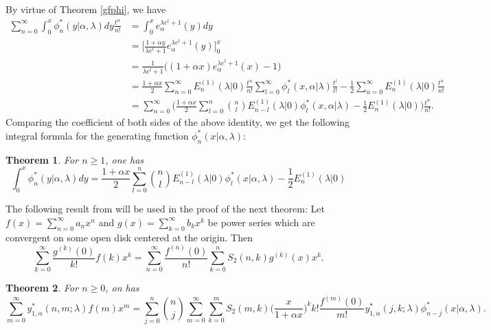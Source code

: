 \documentclass{amsart}
\newtheorem{theorem}{Theorem}[section]
\numberwithin{equation}{section}
\theoremstyle{definition}
\theoremstyle{remark}
\begin{document}
By virtue of Theorem \ref{gfphi}, we have 
\begin{align}
    \sum_{n=0}^{\infty}\int_{0}^{x}\phi^{*}_{n}(y|\alpha,\lambda)dy\frac{t^n}{n!}&=\int_{0}^{x}e_{\alpha}^{\lambda e^{t}+1}(y)dy\\
    &=\Bigg[\frac{1+\alpha y}{\lambda e^t+1}e_{\alpha}^{\lambda e^t+1}(y)\Bigg]_{0}^{x}\\
    &=\frac{1}{\lambda e^t+1}\Big((1+\alpha x)e_{\alpha}^{\lambda e^t+1}(x)-1\Big)\label{integeq2}\\
    &=\frac{1+\alpha x}{2}\sum_{n=0}^{\infty}E_{n}^{(1)}(\lambda|0)\frac{t^n}{n!}\sum_{l=0}^{\infty}\phi^{*}_{l}(x,\alpha|\lambda)\frac{t^l}{l!}-\frac{1}{2}\sum_{n=0}^{\infty}E_{n}^{(1)}(\lambda|0)\frac{t^n}{n!}\\
    &=\sum_{n=0}^{\infty}\bigg(\frac{1+\alpha x}{2}\sum_{l=0}^{n}\binom{n}{l}E_{n-l}^{(1)}(\lambda|0)\phi^{*}_{l}(x,\alpha|\lambda)-\frac{1}{2}E_{n}^{(1)}(\lambda|0)\bigg)\frac{t^n}{n!}.
\end{align}
Comparing the coefficient of both sides of the above identity, we get the following integral formula for the generating function $\phi^{*}_{n}(x|\alpha,\lambda)$:
\begin{theorem}\label{integphi}
For $n\geq 1$, one has
\begin{equation}
    \int_{0}^{x}\phi^{*}_{n}(y|\alpha,\lambda)dy=\frac{1+\alpha x}{2}\sum_{l=0}^{n}\binom{n}{l}E_{n-l}^{(1)}(\lambda|0)\phi^{*}_{l}(x|\alpha,\lambda)-\frac{1}{2}E_{n}^{(1)}(\lambda|0)
\end{equation}
\end{theorem}
The following result from \cite{KNB2005, TKDSK2022} will be used in the proof of the next theorem: Let $f(x)=\sum_{n=0}^{\infty}a_nx^n$ and $g(x)=\sum_{k=0}^{\infty}b_kx^k$ be power series which are convergent on some open disk centered at the origin. Then 
\begin{equation}\label{Formpowerseries}
    \sum_{k=0}^{\infty}\frac{g^{(k)}(0)}{k!}f(k)x^k=\sum_{n=0}^{\infty}\frac{f^{(n)}(0)}{n!}\sum_{k=0}^{n}S_{2}(n,k)g^{(k)}(x)x^k.
\end{equation}
\begin{theorem}
For $n\geq 0$, on has
$$\sum_{m=0}^{\infty}y_{1,\alpha}^{*}(n,m;\lambda)f(m)x^m=\sum_{j=0}^{n}\binom{n}{j}\sum_{m=0}^{\infty}\sum_{k=0}^{m}S_{2}(m,k)\Big(\frac{x}{1+\alpha x}\Big)^kk!\frac{f^{(m)}(0)}{m!}y_{1, \alpha}^{*}(j,k;\lambda)\phi^{*}_{n-j}(x|\alpha,\lambda).$$
\end{theorem}
\end{document}
